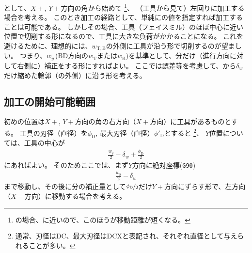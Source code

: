 


\clearpage
\EndFacecutMilling として、$X+$, $Y+$方向の角から始めて
\footnote{\DMC の場合、\ToolExchangePoint に近いので、このほうが移動距離が短くなる。}、
（工具から見て）左回りに加工する場合を考える。
このとき加工の経路として、単純に\OuterDiameter の値を指定すれば加工することは可能である。
しかしその場合、工具（フェイスミル）のほぼ中心に近い位置で切削する形になるので、工具に大きな負荷がかかることになる。
これを避けるために、理想的には、\InnerDiameter$w_{\mathrm T, \mathrm B}$の外側に工具が沿う形で切削するのが望ましい。
つまり、\EndFaceID$w_y$\,(BD方向の$w_{\mathrm T}$または$w_{\mathrm B}$)を基準として、\ToolRadius 分だけ（進行方向に対して右側に）補正をする形にすればよい。
ここでは誤差等を考慮して、\EndFaceID から$\delta_w$だけ縮めた輪郭（の外側）に沿う形を考える。


\subsection{加工の開始可能範囲}
初めの位置は$X+$, $Y+$方向の角の右方向（$X+$方向）に工具があるものとする。
工具の刃径（直径）を$\phi_\mathrm D$, 最大刃径（直径）$\phi'_\mathrm D$とすると
\footnote{通常、刃径はDC、最大刃径はDCXと表記され、それぞれ直径として与えられることが多い。}、
$Y$位置については、工具の中心が
\begin{align}
  \label{eq:tanmenKakouStartY}
  \frac{w_y}2-\delta_w+\frac{\phi_\mathrm D}2
\end{align}
にあればよい。
そのためここでは、まず$Y$方向に絶対座標(\verb|G90|)
\begin{align*}
  \frac{w_y}2-\delta_w
\end{align*}
まで移動し、その後に\ToolRadius 分の補正量として$\nicefrac{\phi_\mathrm D}2$だけ$Y+$方向にずらす形で、左方向（$X-$方向）に移動する場合を考える。


